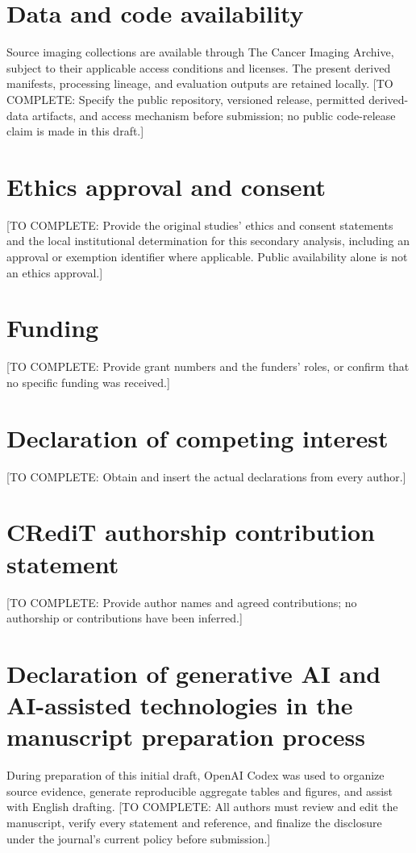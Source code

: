 \documentclass[preprint,12pt,authoryear]{elsarticle}
\newcommand{\todo}[1]{\textcolor{red!70!black}{[TO COMPLETE: #1]}}
\begin{document}
\section*{Data and code availability}
Source imaging collections are available through The Cancer Imaging Archive, subject to their applicable access conditions and licenses. The present derived manifests, processing lineage, and evaluation outputs are retained locally. \todo{Specify the public repository, versioned release, permitted derived-data artifacts, and access mechanism before submission; no public code-release claim is made in this draft.}
\section*{Ethics approval and consent}
\todo{Provide the original studies' ethics and consent statements and the local institutional determination for this secondary analysis, including an approval or exemption identifier where applicable. Public availability alone is not an ethics approval.}
\section*{Funding}
\todo{Provide grant numbers and the funders' roles, or confirm that no specific funding was received.}
\section*{Declaration of competing interest}
\todo{Obtain and insert the actual declarations from every author.}
\section*{CRediT authorship contribution statement}
\todo{Provide author names and agreed contributions; no authorship or contributions have been inferred.}
\section*{Declaration of generative AI and AI-assisted technologies in the manuscript preparation process}
During preparation of this initial draft, OpenAI Codex was used to organize source evidence, generate reproducible aggregate tables and figures, and assist with English drafting. \todo{All authors must review and edit the manuscript, verify every statement and reference, and finalize the disclosure under the journal's current policy before submission.}
\appendix



\end{document}
